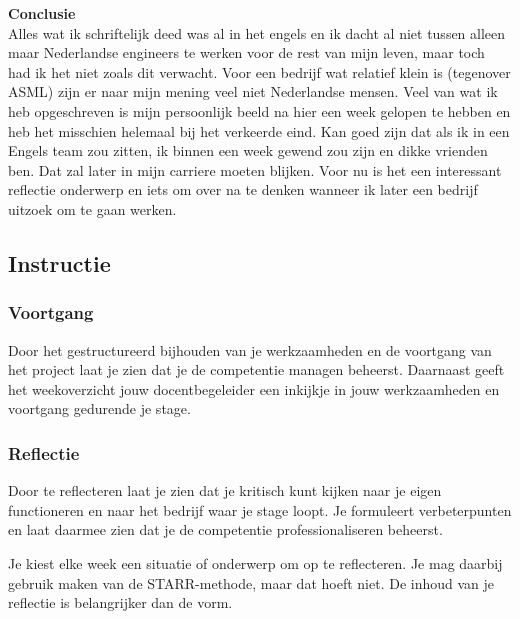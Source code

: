 \documentclass[a4paper,12pt]{article}
\begin{document}
\noindent\textbf{Conclusie}\\
Alles wat ik schriftelijk deed was al in het engels en ik dacht al niet tussen alleen maar Nederlandse engineers te werken voor de rest van mijn leven, maar toch had ik het niet zoals dit verwacht.
Voor een bedrijf wat relatief klein is (tegenover ASML) zijn er naar mijn mening veel niet Nederlandse mensen.
Veel van wat ik heb opgeschreven is mijn persoonlijk beeld na hier een week gelopen te hebben en heb het misschien helemaal bij het verkeerde eind.
Kan goed zijn dat als ik in een Engels team zou zitten, ik binnen een week gewend zou zijn en dikke vrienden ben. 
Dat zal later in mijn carriere moeten blijken.
Voor nu is het een interessant reflectie onderwerp en iets om over na te denken wanneer ik later een bedrijf uitzoek om te gaan werken.


\newpage

\subsection*{Instructie}

\subsubsection*{Voortgang}
Door het gestructureerd bijhouden van je werkzaamheden en de voortgang van het project laat je zien dat je de competentie managen beheerst. Daarnaast geeft het weekoverzicht jouw docentbegeleider een inkijkje in jouw werkzaamheden en voortgang gedurende je stage.

\subsubsection*{Reflectie}
Door te reflecteren laat je zien dat je kritisch kunt kijken naar je eigen functioneren en naar het bedrijf waar je stage loopt. Je formuleert verbeterpunten en laat daarmee zien dat je de competentie professionaliseren beheerst.

Je kiest elke week een situatie of onderwerp om op te reflecteren. Je mag daarbij gebruik maken van de STARR-methode, maar dat hoeft niet. De inhoud van je reflectie is belangrijker dan de vorm.
\end{document}
